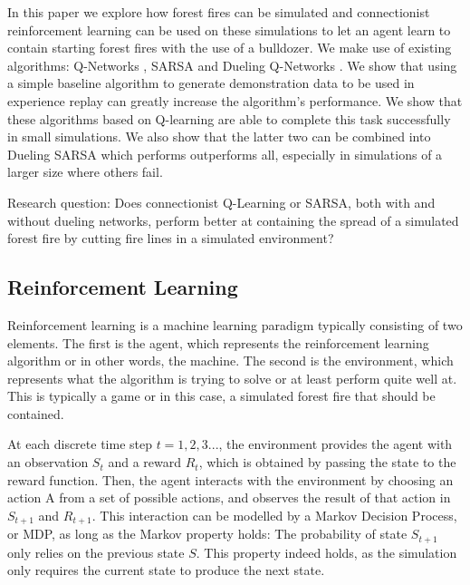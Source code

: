 In this paper we explore how forest fires can be simulated and connectionist reinforcement learning can be used on these simulations to let an agent learn to contain starting forest fires with the use of a bulldozer. We make use of existing algorithms: Q-Networks \citep{mnih2015human}, SARSA and Dueling Q-Networks \citep{wang2015dueling}. We show that using a simple baseline algorithm to generate demonstration data to be used in experience replay can greatly increase the algorithm's performance. We show that these algorithms based on Q-learning are able to complete this task successfully in small simulations. We also show that the latter two can be combined into Dueling SARSA which performs outperforms all, especially in simulations of a larger size where others fail.


Research question: Does connectionist Q-Learning or SARSA, both with and without dueling networks, perform better at containing the spread of a simulated forest fire by cutting fire lines in a simulated environment?

\subsection{Reinforcement Learning}\label{sec:reinforcementlearning}
Reinforcement learning is a machine learning paradigm typically consisting of two elements. The first is the agent, which represents the reinforcement learning algorithm or in other words, the machine. The second is the environment, which represents what the algorithm is trying to solve or at least perform quite well at. This is typically a game or in this case, a simulated forest fire that should be contained.

At each discrete time step $t=1,2,3...$, the environment provides the agent with an observation $S_t$ and a reward $R_t$, which is obtained by passing the state to the reward function. Then, the agent interacts with the environment by choosing an action A from a set of possible actions, and observes the result of that action in $S_{t+1}$ and $R_{t+1}$. This interaction can be modelled by a Markov Decision Process, or MDP, as long as the Markov property holds: The probability of state $S_{t+1}$ only relies on the previous state $S$. This property indeed holds, as the simulation only requires the current state to produce the next state.

